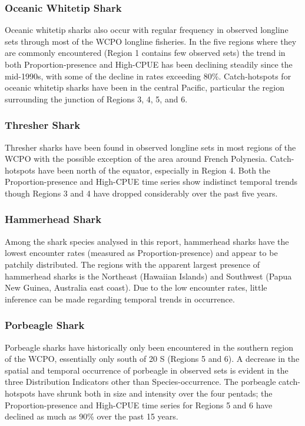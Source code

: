 \documentclass[12pt]{SCreport}
\begin{document}
 \subsubsection{Oceanic Whitetip Shark}
 Oceanic whitetip sharks also occur with regular frequency in observed longline sets through most of the WCPO longline fisheries.  In the five regions where they are commonly encountered (Region 1 contains few observed sets) the trend in both Proportion-presence and High-CPUE has been declining steadily since the mid-1990s, with some of the decline in rates exceeding 80\%.  Catch-hotspots for oceanic whitetip sharks have been in the central Pacific, particular the region surrounding the junction of Regions 3, 4, 5, and 6.

 \subsubsection{Thresher Shark}
 Thresher sharks have been found in observed longline sets in most regions of the WCPO with the possible exception of the area around French Polynesia. Catch-hotspots have been north of the equator, especially in Region 4. Both the Proportion-presence and High-CPUE time series show indistinct temporal trends though Regions 3 and 4 have dropped considerably over the past five years.

 \subsubsection{Hammerhead Shark}
 Among the shark species analysed in this report, hammerhead sharks have the lowest encounter rates (measured as Proportion-presence) and appear to be patchily distributed.  The regions with the apparent largest presence of hammerhead sharks is the Northeast (Hawaiian Islands) and Southwest (Papua New Guinea, Australia east coast).  Due to the low encounter rates, little inference can be made regarding temporal trends in occurrence.
         
 \subsubsection{Porbeagle Shark}
 Porbeagle sharks have historically only been encountered in the southern region of the WCPO, essentially only south of 20 \degree S (Regions 5 and 6).  A decrease in the spatial and temporal occurrence of porbeagle in observed sets is evident in the three Distribution Indicators other than Species-occurrence.  The porbeagle catch-hotspots have shrunk both in size and intensity over the four pentads; the Proportion-presence and High-CPUE time series for Regions 5 and 6 have declined as much as 90\% over the past 15 years.
 
\end{document}
